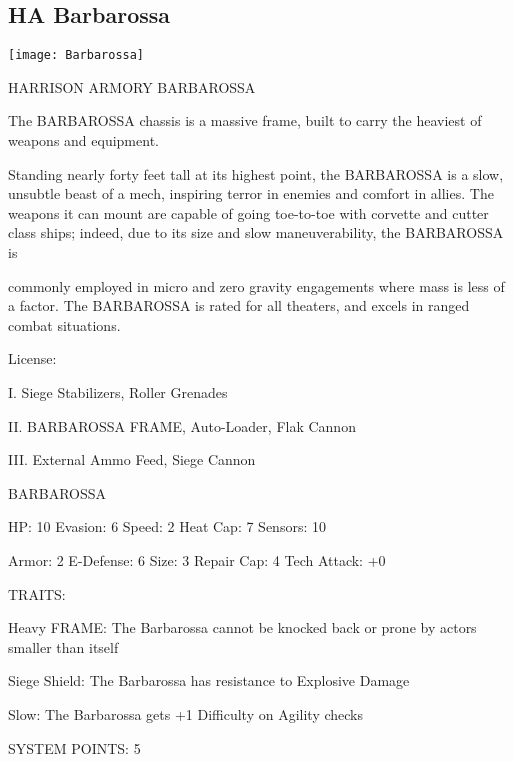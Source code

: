 \subsection{HA Barbarossa}


\begin{center}
    \texttt{[image: Barbarossa]}
\end{center}

                           HARRISON ARMORY BARBAROSSA

The BARBAROSSA chassis is a massive frame, built to carry the heaviest of weapons and equipment.

Standing nearly forty feet tall at its highest point, the BARBAROSSA is a slow, unsubtle beast of a mech,
inspiring terror in enemies and comfort in allies. The weapons it can mount are capable of going toe-to-toe
with corvette and cutter class ships; indeed, due to its size and slow maneuverability, the BARBAROSSA is




commonly employed in micro and zero gravity engagements where mass is less of a factor. The
BARBAROSSA is rated for all theaters, and excels in ranged combat situations.

                                                  License:

I. Siege Stabilizers, Roller Grenades

II. BARBAROSSA FRAME, Auto-Loader, Flak Cannon

III. External Ammo Feed, Siege Cannon


                                            BARBAROSSA

 HP: 10         Evasion: 6                           Speed: 2           Heat Cap: 7       Sensors: 10

 Armor:  2      E-Defense: 6                         Size: 3            Repair Cap: 4     Tech Attack:
                                                                                          +0

                                                  TRAITS:

 Heavy FRAME: The Barbarossa cannot be knocked back or prone by actors smaller than itself

 Siege Shield: The Barbarossa has resistance to Explosive Damage

 Slow: The Barbarossa gets +1 Difficulty on Agility checks

                                           SYSTEM POINTS: 5

